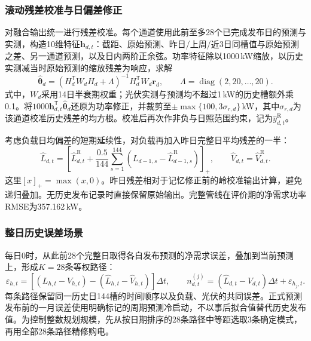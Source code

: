 \subsubsection{滚动残差校准与日偏差修正}

对融合输出统一进行残差校准。每个通道使用此前至多28个已完成发布日的预测与实测，构造10维特征$\mathbf h_{d,t}$：截距、原始预测、昨日/上周/近3日同槽值与原始预测之差、另一通道预测，以及日内两阶正余弦。功率特征除以1000\,kW缩放，以历史实测减当时原始预测的缩放残差为响应，求解
\begin{equation}\label{eq:q2-ridge}
 \widehat{\boldsymbol\theta}_d
 =(H_d^{\mathsf T}W_dH_d+\Lambda)^{-1}H_d^{\mathsf T}W_d\mathbf r_d,
 \qquad \Lambda=\operatorname{diag}(2,20,\ldots,20).
\end{equation}
式中，$W_d$采用14日半衰期权重；光伏实测与预测均不超过1\,kW的历史槽额外乘0.1。将$1000\mathbf h_{d,t}^{\mathsf T}\widehat{\boldsymbol\theta}_d$还原为功率修正，并裁剪至$\pm\max\{100,3\sigma_{r,d}\}$\,kW，其中$\sigma_{r,d}$为该通道校准历史残差的均方根。校准后再次作非负与日照范围约束，记为$\widehat y^{\mathrm R}_{d,t}$。

考虑负载日均偏差的短期延续性，对负载再加入昨日完整日平均残差的一半：
\begin{equation}\label{eq:q2-memory}
 \widehat L_{d,t}=\left[\widehat L^{\mathrm R}_{d,t}
 +\frac{0.5}{144}\sum_{s=1}^{144}
 (L_{d-1,s}-\widehat L^{\mathrm R}_{d-1,s})\right]_+,
 \qquad \widehat V_{d,t}=\widehat V^{\mathrm R}_{d,t}.
\end{equation}
这里$[x]_+=\max(x,0)$。昨日残差相对于记忆修正前的岭校准输出计算，避免递归叠加。无历史发布记录时直接保留原始输出。完整管线在评价期的净需求功率RMSE为357.162\,kW。

\subsubsection{整日历史误差场景}

每日0时，从此前28个完整日取得各自发布预测的净需求误差，叠加到当前预测上，形成$K=28$条等权路径：
\begin{equation}\label{eq:q2-paths}
 \varepsilon_{h,t}=[(L_{h,t}-V_{h,t})-(\widehat L_{h,t}-\widehat V_{h,t})]\Delta t,
 \qquad n^{(j)}_{d,t}=(\widehat L_{d,t}-\widehat V_{d,t})\Delta t+\varepsilon_{h_j,t}.
\end{equation}
每条路径保留同一历史日144槽的时间顺序以及负载、光伏的共同误差。正式预测发布前的一月误差使用明确标记的周期预测冷启动，不以事后拟合值替代历史发布值。为控制整数规划规模，先从按日期排序的28条路径中等距选取3条确定模式，再用全部28条路径精修购电。

